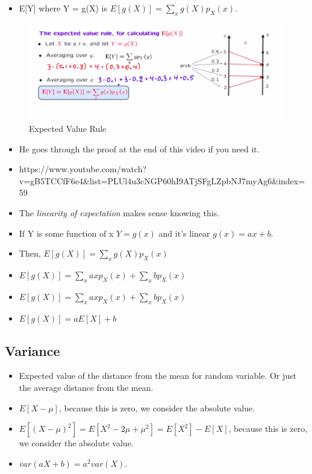 \documentclass[11pt]{article}
\begin{document}
\begin{itemize}
\tightlist
\item
  E{[}Y{]} where Y = g(X) is \(E[g(X)] = \sum_xg(X)p_X(x)\).
\end{itemize}

\begin{figure}
\centering
\includegraphics{img/expectedvaluerule.png}
\caption{Expected Value Rule}
\end{figure}

\begin{itemize}
\tightlist
\item
  He goes through the proof at the end of this video if you need it.
\item
  https://www.youtube.com/watch?v=gB5TCCfF6e4\&list=PLUl4u3cNGP60hI9ATjSFgLZpbNJ7myAg6\&index=59
\item
  The \emph{linearity of expectation} makes sense knowing this.
\item
  If Y is some function of x \(Y = g(x)\) and it's linear
  \(g(x) = ax + b\).
\item
  Then, \(E[g(X)] = \sum_xg(X)p_X(x)\)
\item
  \(E[g(X)] = \sum_xaxp_X(x) + \sum_xbp_X(x)\)
\item
  \(E[g(X)] = \sum_xaxp_X(x) + \sum_xbp_X(x)\)
\item
  \(E[g(X)] = aE[X] + b\)
\end{itemize}

\hypertarget{variance}{%
\subsection{Variance}\label{variance}}

\begin{itemize}
\tightlist
\item
  Expected value of the distance from the mean for random variable. Or
  just the average distance from the mean.
\item
  \(E[X - \mu]\), because this is zero, we consider the absolute value.
\item
  \(E[(X - \mu)^2] = E[X^2 -2\mu + \mu^2] = E[X^2] - E[X]\), because
  this is zero, we consider the absolute value.
\item
  \(var(aX + b) = a^2var(X)\).
\end{itemize}
\end{document}
